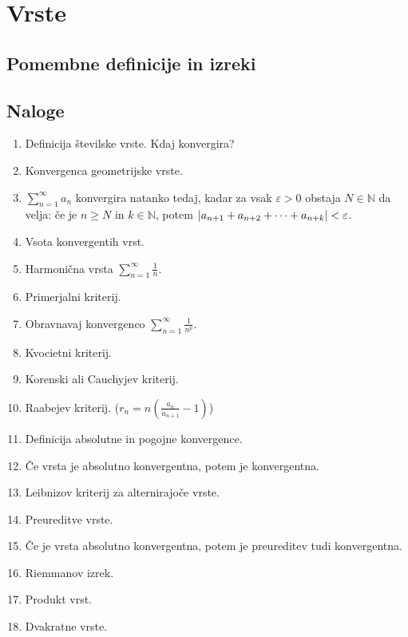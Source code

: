 \documentclass[a4paper,12pt]{report}
\begin{document}
\chapter{Vrste}

\section*{Pomembne definicije in izreki}

\pagebreak

\section*{Naloge}

\begin{enumerate}
    \item Definicija številske vrste. Kdaj konvergira?
    \item Konvergenca geometrijske vrste.
    \item $\sum_{n=1}^{\infty}a_n$ konvergira natanko tedaj, kadar za vsak $\varepsilon > 0$ obstaja $N \in \mathbb{N}$ da velja:
            če je $n \geq N$ in $k \in \mathbb{N}$, potem $\abs{a_{n+1} + a_{n+2} + \dots + a_{n+k}} < \varepsilon$.
    \item Vsota konvergentih vrst.
    \item Harmonična vrsta $\sum_{n=1}^{\infty} \frac{1}{n}$.
    \item Primerjalni kriterij.
    \item Obravnavaj konvergenco $\sum_{n=1}^{\infty} \frac{1}{n^p}$.
    \item Kvocietni kriterij.
    \item Korenski ali Cauchyjev kriterij.
    \item Raabejev kriterij. ($r_n = n (\frac{a_n}{a_{n+1}} - 1)$)
    \item Definicija absolutne in pogojne konvergence.
    \item Če vrsta je absolutno konvergentna, potem je konvergentna.
    \item Leibnizov kriterij za alternirajoče vrste.
    \item Preureditve vrste.
    \item Če je vrsta absolutno konvergentna, potem je preureditev tudi konvergentna.
    \item Riemmanov izrek.
    \item Produkt vrst.
    \item Dvakratne vrste.
\end{enumerate}
\end{document}
